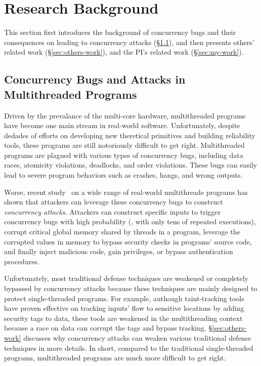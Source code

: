 
\section{Research Background} \label{sec:related}

This section first introduces the background of concurrency bugs and 
their consequences on leading to concurrency attacks (\S\ref{sec:background}), 
and then presents others' related work (\S\ref{sec:others-work}), and the PI's 
related work (\S\ref{sec:my-work}).

\subsection{Concurrency Bugs and Attacks in Multithreaded Programs} 
\label{sec:background}

Driven by the prevalance of the multi-core hardware, multithreaded programs 
have become one main stream in real-world software. Unfortunately, despite 
dedades of efforts on developing new theretical primitives and building 
reliability tools, these programs are still notoriously difficult to get right. 
Multithreaded programs are plagued with various types of concurrency bugs, 
including data races, atomicity violations, deadlocks, and order violations. 
These bugs can easily lead to severe program behaviors such as crashes, hangs, 
and wrong outputs.



Worse, recent study~\cite{con:hotpar12} on a wide range of real-world 
multithreade programs has shown that attackers can leverage these concurrency 
bugs to construct \emph{concurrency attacks}. Attackers can construct specific 
inputs to trigger concurrency bugs with high probability (\eg, with only tens 
of repeated executions), corrupt critical global memory shared by threads in 
a program, leverage the corrupted values in memory to bypass security 
checks in programs' source code, and finally inject malicious code, gain 
privileges, or bypass authentication procedures.

Unfortunately, most traditional defense techniques are weakened or completely 
bypassed by concurrency attacks because these techniques are mainly designed to 
protect single-threaded programs. For example, authough taint-tracking tools 
have proven effective on tracking inputs' flow to sensitive locations by 
adding security tags to data, these tools are weakened in the multithreading 
context because a race on data can corrupt the tags and bypass tracking. 
\S\ref{sec:others-work} discusses why concurrency attacks can weaken various 
traditional defense techniques in more details. In short, compared to the 
traditional single-threaded programs, multithreaded programs are much more 
difficult to get right.


